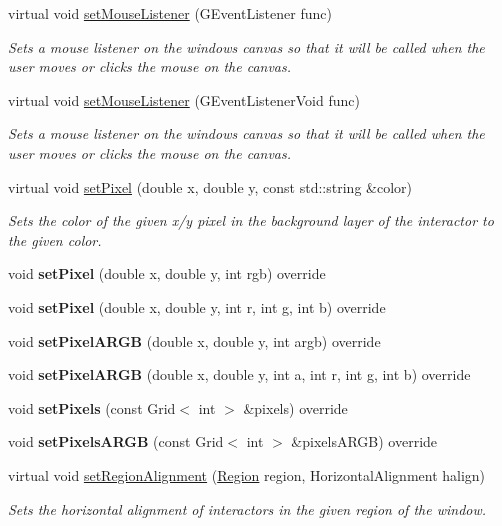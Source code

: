 \begin{DoxyCompactItemize}
virtual void \mbox{\hyperlink{classGWindow_a37d8dbc943f59920f705b0104f60bde2}{set\+Mouse\+Listener}} (G\+Event\+Listener func)
\begin{DoxyCompactList}\small\item\em Sets a mouse listener on the window\textquotesingle{}s canvas so that it will be called when the user moves or clicks the mouse on the canvas. \end{DoxyCompactList}\item 
virtual void \mbox{\hyperlink{classGWindow_aea7f647ea62d59f71b5fad6aa65eeaf9}{set\+Mouse\+Listener}} (G\+Event\+Listener\+Void func)
\begin{DoxyCompactList}\small\item\em Sets a mouse listener on the window\textquotesingle{}s canvas so that it will be called when the user moves or clicks the mouse on the canvas. \end{DoxyCompactList}\item 
virtual void \mbox{\hyperlink{classGDrawingSurface_a09f9640e4ff7388dcfc391efd88d2415}{set\+Pixel}} (double x, double y, const std\+::string \&color)
\begin{DoxyCompactList}\small\item\em Sets the color of the given x/y pixel in the background layer of the interactor to the given color. \end{DoxyCompactList}\item 
void {\bfseries set\+Pixel} (double x, double y, int rgb) override
\item 
void {\bfseries set\+Pixel} (double x, double y, int r, int g, int b) override
\item 
void {\bfseries set\+Pixel\+A\+R\+GB} (double x, double y, int argb) override
\item 
void {\bfseries set\+Pixel\+A\+R\+GB} (double x, double y, int a, int r, int g, int b) override
\item 
void {\bfseries set\+Pixels} (const Grid$<$ int $>$ \&pixels) override
\item 
void {\bfseries set\+Pixels\+A\+R\+GB} (const Grid$<$ int $>$ \&pixels\+A\+R\+GB) override
\item 
virtual void \mbox{\hyperlink{classGWindow_a96e9f5593c0193bbdc7ae99945b9cf5f}{set\+Region\+Alignment}} (\mbox{\hyperlink{classGWindow_a81a01a86de31071a92e6cce0bab9bc4b}{Region}} region, Horizontal\+Alignment halign)
\begin{DoxyCompactList}\small\item\em Sets the horizontal alignment of interactors in the given region of the window. \end{DoxyCompactList}\item 

\end{DoxyCompactItemize}
